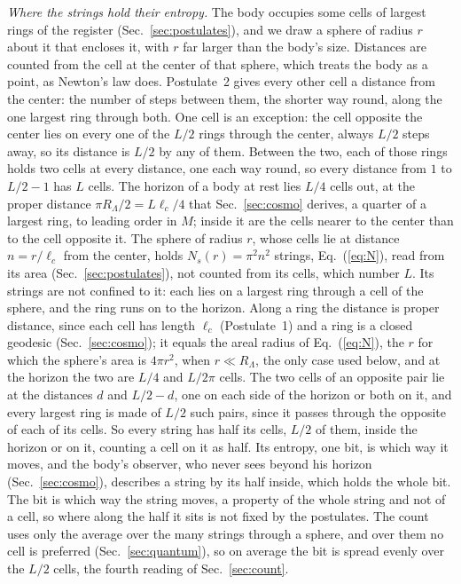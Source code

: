 \documentclass[aps,prd,twocolumn,superscriptaddress,nofootinbib,showkeys]{revtex4-2}
\newcommand{\lc}{\ell_c}
\newcommand{\RL}{R_\Lambda}
\begin{document}
\textit{Where the strings hold their entropy.} The body occupies some cells of largest rings of the register (Sec.~\ref{sec:postulates}), and we draw a sphere of radius $r$ about it that encloses it, with $r$ far larger than the body's size. Distances are counted from the cell at the center of that sphere, which treats the body as a point, as Newton's law does. Postulate~2 gives every other cell a distance from the center: the number of steps between them, the shorter way round, along the one largest ring through both. One cell is an exception: the cell opposite the center lies on every one of the $L/2$ rings through the center, always $L/2$ steps away, so its distance is $L/2$ by any of them. Between the two, each of those rings holds two cells at every distance, one each way round, so every distance from $1$ to $L/2 - 1$ has $L$ cells. The horizon of a body at rest lies $L/4$ cells out, at the proper distance $\pi\RL/2 = L\lc/4$ that Sec.~\ref{sec:cosmo} derives, a quarter of a largest ring, to leading order in $M$; inside it are the cells nearer to the center than to the cell opposite it. The sphere of radius $r$, whose cells lie at distance $n = r/\lc$ from the center, holds $N_s(r) = \pi^2n^2$ strings, Eq.~(\ref{eq:N}), read from its area (Sec.~\ref{sec:postulates}), not counted from its cells, which number $L$. Its strings are not confined to it: each lies on a largest ring through a cell of the sphere, and the ring runs on to the horizon. Along a ring the distance is proper distance, since each cell has length $\lc$ (Postulate~1) and a ring is a closed geodesic (Sec.~\ref{sec:cosmo}); it equals the areal radius of Eq.~(\ref{eq:N}), the $r$ for which the sphere's area is $4\pi r^2$, when $r\ll\RL$, the only case used below, and at the horizon the two are $L/4$ and $L/2\pi$ cells. The two cells of an opposite pair lie at the distances $d$ and $L/2 - d$, one on each side of the horizon or both on it, and every largest ring is made of $L/2$ such pairs, since it passes through the opposite of each of its cells. So every string has half its cells, $L/2$ of them, inside the horizon or on it, counting a cell on it as half. Its entropy, one bit, is which way it moves, and the body's observer, who never sees beyond his horizon (Sec.~\ref{sec:cosmo}), describes a string by its half inside, which holds the whole bit. The bit is which way the string moves, a property of the whole string and not of a cell, so where along the half it sits is not fixed by the postulates. The count uses only the average over the many strings through a sphere, and over them no cell is preferred (Sec.~\ref{sec:quantum}), so on average the bit is spread evenly over the $L/2$ cells, the fourth reading of Sec.~\ref{sec:count}.
\end{document}
